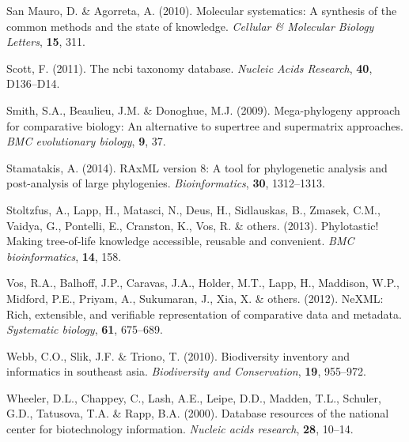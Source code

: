 \documentclass[]{article}
\begin{document}
\leavevmode\hypertarget{ref-san2010molecular}{}%
San Mauro, D. \& Agorreta, A. (2010). Molecular systematics: A synthesis of the common methods and the state of knowledge. \emph{Cellular \& Molecular Biology Letters}, \textbf{15}, 311.

\leavevmode\hypertarget{ref-scott2011ncbi}{}%
Scott, F. (2011). The ncbi taxonomy database. \emph{Nucleic Acids Research}, \textbf{40}, D136--D14.

\leavevmode\hypertarget{ref-smith2009mega}{}%
Smith, S.A., Beaulieu, J.M. \& Donoghue, M.J. (2009). Mega-phylogeny approach for comparative biology: An alternative to supertree and supermatrix approaches. \emph{BMC evolutionary biology}, \textbf{9}, 37.

\leavevmode\hypertarget{ref-stamatakis2014raxml}{}%
Stamatakis, A. (2014). RAxML version 8: A tool for phylogenetic analysis and post-analysis of large phylogenies. \emph{Bioinformatics}, \textbf{30}, 1312--1313.

\leavevmode\hypertarget{ref-stoltzfus2013phylotastic}{}%
Stoltzfus, A., Lapp, H., Matasci, N., Deus, H., Sidlauskas, B., Zmasek, C.M., Vaidya, G., Pontelli, E., Cranston, K., Vos, R. \& others. (2013). Phylotastic! Making tree-of-life knowledge accessible, reusable and convenient. \emph{BMC bioinformatics}, \textbf{14}, 158.

\leavevmode\hypertarget{ref-vos2012nexml}{}%
Vos, R.A., Balhoff, J.P., Caravas, J.A., Holder, M.T., Lapp, H., Maddison, W.P., Midford, P.E., Priyam, A., Sukumaran, J., Xia, X. \& others. (2012). NeXML: Rich, extensible, and verifiable representation of comparative data and metadata. \emph{Systematic biology}, \textbf{61}, 675--689.

\leavevmode\hypertarget{ref-webb2010biodiversity}{}%
Webb, C.O., Slik, J.F. \& Triono, T. (2010). Biodiversity inventory and informatics in southeast asia. \emph{Biodiversity and Conservation}, \textbf{19}, 955--972.

\leavevmode\hypertarget{ref-wheeler2000database}{}%
Wheeler, D.L., Chappey, C., Lash, A.E., Leipe, D.D., Madden, T.L., Schuler, G.D., Tatusova, T.A. \& Rapp, B.A. (2000). Database resources of the national center for biotechnology information. \emph{Nucleic acids research}, \textbf{28}, 10--14.
\end{document}
